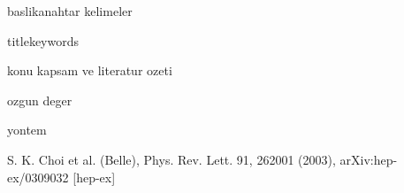 \documentclass[9pt,a4paper]{tub1001}
\begin{document}
\begin{basvuruformu}
\def\vd{vd.}
\begin{projeozeti}{baslik}{anahtar kelimeler}
\vspace*{2cm}
\citet{belle}
\vspace*{2cm}
\end{projeozeti}

\def\vd{{\em et al.}}
\begin{projectsummary}{title}{keywords}
\citet{belle}


\end{projectsummary}

\begin{amacvehedefler}
\vspace*{2cm}
\vspace*{2cm}
\vspace*{2cm}
\end{amacvehedefler}

\begin{konukapsamveliteraturozeti}
konu kapsam ve literatur ozeti
\vspace*{5cm}
\end{konukapsamveliteraturozeti}

\begin{ozgundeger}
ozgun deger
\vspace*{5cm}
\end{ozgundeger}

\begin{yontem}
yontem
\vspace*{5cm}
\end{yontem}


\yurutucutubitakprojeekle{}{}{}{}{}
\yurutucudigerprojeekle{}{}{}{}{}
\projeriskekle{}{}{}
\ekipprojeekle{}{}{}{}{}
\mevcutekipmanekle{}{}{}


\projeciktilarininpaylasimiekle{}{}{}

\projebasariolcutuekle{}{}{}{}
{}
\begin{projeyonetimiekipvearastirmaolanaklari}

\end{projeyonetimiekipvearastirmaolanaklari}

\begin{yayginetki}
\end{yayginetki}
\end{basvuruformu}

\begin{kaynaklar}
\def\vd{vd.} 
\begin{thebibliography}{99}
\bibitem[Choi \noexpand\vd (2003)]{belle}S. K. Choi et al. (Belle), Phys. Rev. Lett. 91, 262001 (2003), arXiv:hep-ex/0309032 [hep-ex] 
\end{thebibliography}
 \end{kaynaklar}
\end{document}
